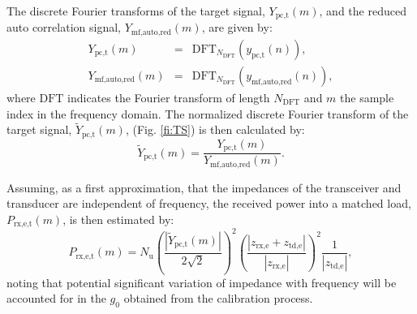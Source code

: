 \documentclass[preprint,12pt,TurnOnLineNumbers]{JASAnew}
\newcommand{\samplesymt}{n}
\newcommand{\samplesymf}{m}
\newcommand{\nchannels}{N_{\textrm{u}}}
\newcommand{\zrxe}{z_{\textrm{rx,e}}}
\newcommand{\ztde}{z_{\textrm{td,e}}}
\newcommand{\ypctarget}{y_{\textrm{pc,t}}}
\newcommand{\ymfautored}{y_{\textrm{mf,auto,red}}}
\newcommand{\ypctargetf}{Y_{\textrm{pc,t}}}
\newcommand{\ypctargetnormf}{\tilde{Y}_{\textrm{pc,t}}}
\newcommand{\ymfautoredf}{Y_{\textrm{mf,auto,red}}}
\newcommand{\prxetf}{P_{\textrm{rx,e,t}}}
\newcommand{\gainzero}{g_0}
\newcommand{\dft}{\textrm{DFT}}
\newcommand{\ndft}{{N_{\textrm{DFT}}}}
\begin{document}
The discrete Fourier transforms of the target signal, $\ypctargetf(\samplesymf)$, and the reduced auto correlation signal, $\ymfautoredf(\samplesymf)$, are given by:
\begin{eqnarray}
\label{eq:DFT_Target_Auto}
\ypctargetf(\samplesymf) & = & \dft_\ndft(\ypctarget(\samplesymt)),\\
\ymfautoredf(\samplesymf) & = & \dft_\ndft(\ymfautored(\samplesymt)),
\end{eqnarray}
where $\dft$ indicates the Fourier transform of length $\ndft$ and $\samplesymf$ the sample index in the frequency domain.
The normalized discrete Fourier transform of the target signal, $\ypctargetnormf(\samplesymf)$, (Fig. \ref{fi:TS}) is then calculated by: 
%
\begin{equation}
\label{eq:DFT_Target_Auto_Norm}
\ypctargetnormf(\samplesymf) = \frac{\ypctargetf(\samplesymf)} {\ymfautoredf(\samplesymf)}.
\end{equation}

Assuming, as a first approximation, that the impedances of the transceiver and transducer are independent of frequency, the received power into a matched load, $\prxetf(\samplesymf)$, is then estimated by:
\begin{equation}
\label{eq:prx_FFT_target}
\prxetf(\samplesymf) = \nchannels\left( \frac{|\ypctargetnormf(\samplesymf)|}{2\sqrt{2}} \right)^2 
\left( \frac{|\zrxe+\ztde|}{|\zrxe|}\right)^2 \frac{1}{|\ztde|}, %
\end{equation}
%
noting that potential significant variation of impedance with frequency will be accounted for in the $\gainzero$ obtained from the calibration process.
\end{document}
